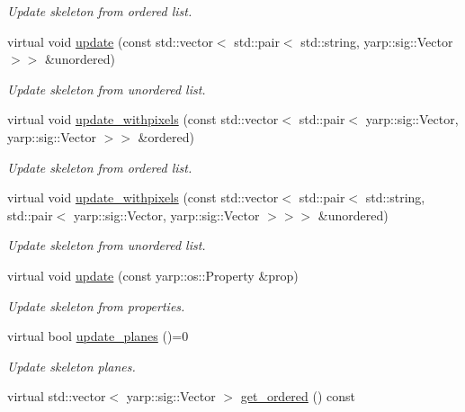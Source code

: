 \begin{DoxyCompactItemize}
\begin{DoxyCompactList}\small\item\em Update skeleton from ordered list. \end{DoxyCompactList}\item 
virtual void \hyperlink{classassistive__rehab_1_1Skeleton_ab9642d6621d0a2b189c020f4d7695b14}{update} (const std\+::vector$<$ std\+::pair$<$ std\+::string, yarp\+::sig\+::\+Vector $>$$>$ \&unordered)
\begin{DoxyCompactList}\small\item\em Update skeleton from unordered list. \end{DoxyCompactList}\item 
virtual void \hyperlink{classassistive__rehab_1_1Skeleton_a20d9eb5aecd6dccfa7e049bb932a6cef}{update\+\_\+withpixels} (const std\+::vector$<$ std\+::pair$<$ yarp\+::sig\+::\+Vector, yarp\+::sig\+::\+Vector $>$$>$ \&ordered)
\begin{DoxyCompactList}\small\item\em Update skeleton from ordered list. \end{DoxyCompactList}\item 
virtual void \hyperlink{classassistive__rehab_1_1Skeleton_a36e9dfd4910120025e40ccc3d03c0e01}{update\+\_\+withpixels} (const std\+::vector$<$ std\+::pair$<$ std\+::string, std\+::pair$<$ yarp\+::sig\+::\+Vector, yarp\+::sig\+::\+Vector $>$$>$$>$ \&unordered)
\begin{DoxyCompactList}\small\item\em Update skeleton from unordered list. \end{DoxyCompactList}\item 
virtual void \hyperlink{classassistive__rehab_1_1Skeleton_ae3346b2f363e1812fdc88e59d1f7bf7d}{update} (const yarp\+::os\+::\+Property \&prop)
\begin{DoxyCompactList}\small\item\em Update skeleton from properties. \end{DoxyCompactList}\item 
virtual bool \hyperlink{classassistive__rehab_1_1Skeleton_af0ee2be195f804a9562cb184a2be0bad}{update\+\_\+planes} ()=0
\begin{DoxyCompactList}\small\item\em Update skeleton planes. \end{DoxyCompactList}\item 
virtual std\+::vector$<$ yarp\+::sig\+::\+Vector $>$ \hyperlink{classassistive__rehab_1_1Skeleton_a9c56f7f9e243ae2c4c3fef6dbb051dc2}{get\+\_\+ordered} () const

\end{DoxyCompactItemize}
